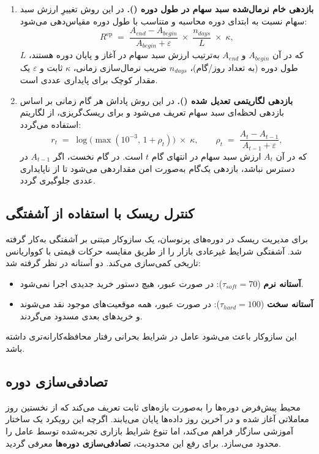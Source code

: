 \documentclass[12pt, a4paper]{report}
\begin{document}
\begin{enumerate}
    \item \textbf{بازدهی خام نرمال‌شده سبد سهام در طول دوره ().}
    در این روش تغییرِ ارزش سبد سهام نسبت به ابتدای دوره محاسبه و متناسب با طول دوره مقیاس‌دهی می‌شود:
    \[
    R^{\text{ep}} \;=\; 
    \frac{A_{end} - A_{begin}}{A_{begin} + \varepsilon}
    \;\times\;
    \frac{n_{days}}{L}
    \;\times\;
    \kappa,
    \]
    که در آن \(A_{begin}\) و \(A_{end}\) به‌ترتیب ارزش سبد سهام در آغاز و پایان دوره هستند، 
    \(L\) طول دوره (به تعداد روز/گام)، \(n_{days}\) ضریب نرمال‌سازی زمانی، 
    \(\kappa\) ثابت  و \(\varepsilon\) یک مقدار کوچک برای پایداری عددی است.
    \vspace{0.25em}

    \item \textbf{بازدهی لگاریتمی تعدیل شده ().}
    در این روش پاداش هر گام زمانی بر اساس بازدهی لحظه‌ای سبد سهام تعریف می‌شود و برای ریسک‌گریزی، از لگاریتم استفاده می‌گردد:
    \[
    r_t \;=\; \log\!\big( \max(10^{-3},\, 1 + \rho_t) \big)\; \times\; \kappa,
    \qquad
    \rho_t \;=\; \frac{A_t - A_{t-1}}{A_{t-1} + \varepsilon},
    \]
    که در آن \(A_t\) ارزش سبد سهام در انتهای گام \(t\) است. 
    در گام نخست، اگر \(A_{t-1}\) در دسترس نباشد، بازدهی یک‌گام به‌صورت امن مقداردهی می‌شود تا از ناپایداری عددی جلوگیری گردد.
\end{enumerate}



\subsection{کنترل ریسک با استفاده از آشفتگی}
برای مدیریت ریسک در دوره‌های پرنوسان، یک سازوکار مبتنی بر آشفتگی به‌کار گرفته شد.  
آشفتگی شرایط غیرعادی بازار را از طریق مقایسه حرکات قیمتی با کوواریانس تاریخی کمی‌سازی می‌کند.  
دو آستانه در نظر گرفته شد:
\begin{itemize}
    \item \textbf{آستانه نرم} ($\tau_{soft} = 70$): در صورت عبور، هیچ دستور خرید جدیدی اجرا نمی‌شود.  
    \item \textbf{آستانه سخت} ($\tau_{hard} = 100$): در صورت عبور، همه موقعیت‌های موجود نقد می‌شوند و خریدهای بعدی مسدود می‌گردند.  
\end{itemize}

این سازوکار باعث می‌شود عامل در شرایط بحرانی رفتار محافظه‌کارانه‌تری داشته باشد.  

\subsection{تصادفی‌سازی دوره}
محیط پیش‌فرض  دوره‌‌ها را به‌صورت بازه‌های ثابت تعریف می‌کند که از نخستین روز معاملاتی آغاز شده و در آخرین روز داده‌ها پایان می‌یابند.  
اگرچه این رویکرد یک ساختار آموزشی سازگار فراهم می‌کند، اما تنوع شرایط بازاری تجربه‌شده توسط عامل را محدود می‌سازد.  
برای رفع این محدودیت، \textbf{تصادفی‌سازی دوره‌ها} معرفی گردید.  
\end{document}
